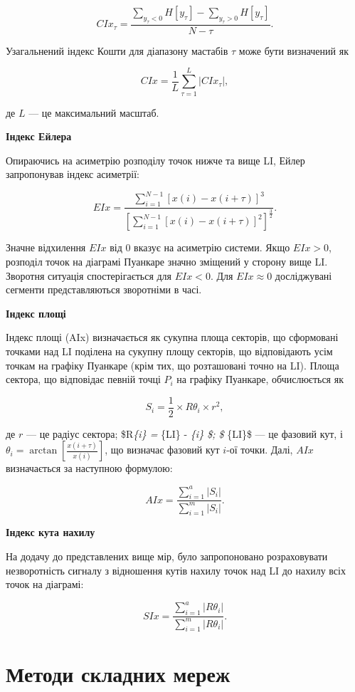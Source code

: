 \documentclass[
  letterpaper,
]{report}
\begin{document}
\[ 
CIx_{\tau} = \frac{\sum_{y_{\tau}<0} H[y_{\tau}] - \sum_{y_{\tau}>0} H[y_{\tau}]}{N-\tau}. 
\]

Узагальнений індекс Кошти для діапазону мастабів \(\tau\) може бути
визначений як

\[ 
CIx = \frac{1}{L} \sum_{\tau=1}^{L} |CIx_{\tau}|, 
\]

де \(L\) --- це максимальний масштаб.

\textbf{Індекс Ейлера}

Опираючись на асиметрію розподілу точок нижче та вище LI, Ейлер
запропонував індекс асиметрії:

\[ 
EIx = \frac{\sum_{i=1}^{N-1} \left[ x(i)-x(i+\tau) \right]^{3}}{\left[ \sum_{i=1}^{N-1} \left[ x(i)-x(i+\tau) \right]^{2} \right]^{\frac{3}{2}}}. 
\]

Значне відхилення \(EIx\) від 0 вказує на асиметрію системи. Якщо
\(EIx>0\), розподіл точок на діаграмі Пуанкаре значно зміщений у сторону
вище LI. Зворотня ситуація спостерігається для \(EIx<0\). Для
\(EIx \approx 0\) досліджувані сегменти представляються зворотніми в
часі.

\textbf{Індекс площі}

Індекс площі (AIx) визначається як сукупна площа секторів, що сформовані
точками над LI поділена на сукупну площу секторів, що відповідають усім
точкам на графіку Пуанкаре (крім тих, що розташовані точно на LI). Площа
сектора, що відповідає певній точці \(P_{i}\) на графіку Пуанкаре,
обчислюється як

\[ 
S_{i} = \frac{1}{2} \times R\theta_{i} \times r^{2}, 
\]

де \(r\) --- це радіус сектора; \$R\theta\emph{\{i\} = \theta}\{LI\} -
\theta\emph{\{i\} \$; \$ \theta}\{LI\}\$ --- це фазовий кут, і
\(\theta_{i} = \arctan{\left[ \frac{x(i+\tau)}{x(i)} \right]}\), що
визначає фазовий кут \(i\)-ої точки. Далі, \(AIx\) визначається за
наступною формулою:

\[ 
AIx = \frac{\sum_{i=1}^{a}|S_{i}|}{\sum_{i=1}^{m}|S_{i}|}. 
\]

\textbf{Індекс кута нахилу}

На додачу до представлених вище мір, було запропоновано розраховувати
незворотність сигналу з відношення кутів нахилу точок над LI до нахилу
всіх точок на діаграмі:

\[ 
SIx = \frac{\sum_{i=1}^{a}|R\theta_{i}|}{\sum_{i=1}^{m}|R\theta_{i}|}. 
\]

\hypertarget{ux43cux435ux442ux43eux434ux438-ux441ux43aux43bux430ux434ux43dux438ux445-ux43cux435ux440ux435ux436}{%
\section{Методи складних
мереж}\label{ux43cux435ux442ux43eux434ux438-ux441ux43aux43bux430ux434ux43dux438ux445-ux43cux435ux440ux435ux436}}
\end{document}
